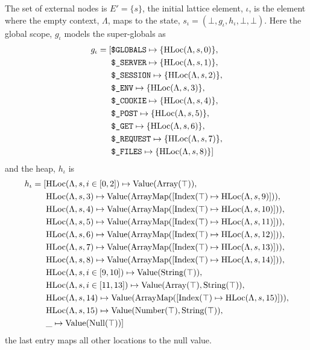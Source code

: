 The set of external nodes is $E' = \{s\}$, the initial lattice element, $\iota$, is the element where the empty context, $\Lambda$, maps to the state, $s_\iota = (\bot, g_\iota, h_\iota, \bot, \bot)$. Here the global scope, $g_\iota$ models the super-globals as
\begin{align*}
g_\iota = 	[&\texttt{\$GLOBALS}\mapsto \{\text{HLoc}(\Lambda, s, 0)\},\notag\\
			 &\texttt{\$\_SERVER}\mapsto \{\text{HLoc}(\Lambda, s, 1)\},\notag\\
			 &\texttt{\$\_SESSION}\mapsto \{\text{HLoc}(\Lambda, s, 2)\},\notag\\
			 &\texttt{\$\_ENV}\mapsto \{\text{HLoc}(\Lambda, s, 3)\},\notag\\
			 &\texttt{\$\_COOKIE}\mapsto \{\text{HLoc}(\Lambda, s, 4)\},\notag\\
			 &\texttt{\$\_POST}\mapsto \{\text{HLoc}(\Lambda, s, 5)\},\notag\\
			 &\texttt{\$\_GET}\mapsto \{\text{HLoc}(\Lambda, s, 6)\},\notag\\
			 &\texttt{\$\_REQUEST}\mapsto \{\text{HLoc}(\Lambda, s, 7)\}, \notag\\
			 &\texttt{\$\_FILES}\mapsto \{\text{HLoc}(\Lambda, s, 8)\}]
\end{align*} 
and the heap, $h_\iota$ is
\begin{align*}
h_\iota = [	&\text{HLoc}(\Lambda, s, i\in[0,2])\mapsto \text{Value}(\text{Array}(\top)),\notag\\
			&\text{HLoc}(\Lambda, s, 3)\mapsto \text{Value}(\text{ArrayMap}([\text{Index}(\top)\mapsto\text{HLoc}(\Lambda, s, 9)])),\notag\\
			&\text{HLoc}(\Lambda, s, 4)\mapsto \text{Value}(\text{ArrayMap}([\text{Index}(\top)\mapsto\text{HLoc}(\Lambda, s, 10)])),\notag\\
			&\text{HLoc}(\Lambda, s, 5)\mapsto \text{Value}(\text{ArrayMap}([\text{Index}(\top)\mapsto\text{HLoc}(\Lambda, s, 11)])),\notag\\			
			&\text{HLoc}(\Lambda, s, 6)\mapsto \text{Value}(\text{ArrayMap}([\text{Index}(\top)\mapsto\text{HLoc}(\Lambda, s, 12)])),\notag\\			
			&\text{HLoc}(\Lambda, s, 7)\mapsto \text{Value}(\text{ArrayMap}([\text{Index}(\top)\mapsto\text{HLoc}(\Lambda, s, 13)])),\notag\\			
			&\text{HLoc}(\Lambda, s, 8)\mapsto \text{Value}(\text{ArrayMap}([\text{Index}(\top)\mapsto\text{HLoc}(\Lambda, s, 14)])),\notag\\			
			&\text{HLoc}(\Lambda, s, i \in [9, 10])\mapsto \text{Value}(\text{String}(\top)),\notag\\
			&\text{HLoc}(\Lambda, s, i\in[11,13])\mapsto \text{Value}(\text{Array}(\top),\text{String}(\top)),\notag\\
			&\text{HLoc}(\Lambda, s, 14)\mapsto \text{Value}(\text{ArrayMap}([\text{Index}(\top)\mapsto\text{HLoc}(\Lambda, s, 15)])),\notag\\			
			&\text{HLoc}(\Lambda, s, 15)\mapsto \text{Value}(\text{Number}(\top),\text{String}(\top)),\notag\\
			&\_ \mapsto \text{Value}(\text{Null}(\top))]
\end{align*}
the last entry maps all other locations to the null value. 


